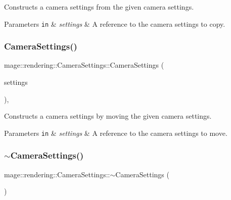 Constructs a camera settings from the given camera settings.


\begin{DoxyParams}[1]{Parameters}
\mbox{\tt in}  & {\em settings} & A reference to the camera settings to copy. \\
\hline
\end{DoxyParams}
\mbox{\label{classmage_1_1rendering_1_1_camera_settings_a08e6d9c319feb6af0c14f4d057220da8}} 
\subsubsection{\texorpdfstring{Camera\+Settings()}{CameraSettings()}\hspace{0.1cm}{\footnotesize\ttfamily [3/3]}}
{\footnotesize\ttfamily mage\+::rendering\+::\+Camera\+Settings\+::\+Camera\+Settings (\begin{DoxyParamCaption}\item[{\mbox{\hyperlink{classmage_1_1rendering_1_1_camera_settings}{Camera\+Settings}} \&\&}]{settings }\end{DoxyParamCaption})\hspace{0.3cm}{\ttfamily [default]}, {\ttfamily [noexcept]}}

Constructs a camera settings by moving the given camera settings.


\begin{DoxyParams}[1]{Parameters}
\mbox{\tt in}  & {\em settings} & A reference to the camera settings to move. \\
\hline
\end{DoxyParams}
\mbox{\label{classmage_1_1rendering_1_1_camera_settings_a0e5badc4e959b8ddad0d7df2da4c934f}} 
\subsubsection{\texorpdfstring{$\sim$\+Camera\+Settings()}{~CameraSettings()}}
{\footnotesize\ttfamily mage\+::rendering\+::\+Camera\+Settings\+::$\sim$\+Camera\+Settings (\begin{DoxyParamCaption}{ }\end{DoxyParamCaption})\hspace{0.3cm}{\ttfamily [default]}}

